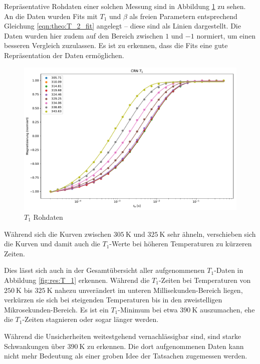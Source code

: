 Repräsentative Rohdaten einer solchen Messung sind in Abbildung \ref{fig:res:T_1_roh} zu sehen. An die Daten wurden Fits mit $T_1$ und $\beta$ als freien Parametern entsprechend Gleichung \eqref{eqn:theo:T_2_fit} angelegt -- diese sind als Linien dargestellt. Die Daten wurden hier zudem auf den Bereich zwischen $1$ und $-1$ normiert, um einen besseren Vergleich zuzulassen. Es ist zu erkennen, dass die Fits eine gute Repräsentation der Daten ermöglichen.
\begin{figure}
	\begin{center}
		\includegraphics[width=\textwidth]{graphics/plots/T1/t1_roh.pdf}
	\end{center}
	\caption{$T_1$ Rohdaten} \label{fig:res:T_1_roh}
\end{figure}
Während sich die Kurven zwischen $\SI{305}{\kelvin}$ und $\SI{325}{\kelvin}$ sehr ähneln, verschieben sich die Kurven und damit auch die $T_1$-Werte bei höheren Temperaturen zu kürzeren Zeiten.

Dies lässt sich auch in der Gesamtübersicht aller aufgenommenen $T_1$-Daten in Abbildung \ref{fig:res:T_1} erkennen. Während die $T_1$-Zeiten bei Temperaturen von $\SI{250}{\kelvin}$ bis $\SI{325}{\kelvin}$ nahezu unverändert im unteren Millisekunden-Bereich liegen, verkürzen sie sich bei steigenden Temperaturen bis in den zweistelligen Mikrosekunden-Bereich. Es ist ein $T_1$-Minimum bei etwa $\SI{390}{\kelvin}$ auszumachen, ehe die $T_1$-Zeiten stagnieren oder sogar länger werden.

Während die Unsicherheiten weitestgehend vernachlässigbar sind, sind starke Schwankungen über $\SI{390}{\kelvin}$ zu erkennen. Die dort aufgenommenen Daten kann nicht mehr Bedeutung als einer groben Idee der Tatsachen zugemessen werden.

